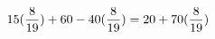 \documentclass[preview]{standalone}
\begin{document}
\begin{align*}
\special{dvisvgm:raw <g id='unique000'>}15(\frac{8}{19}) + 60 - 40(\frac{8}{19}) = 20 + 70(\frac{8}{19})\special{dvisvgm:raw </g>}
\end{align*}
\end{document}
